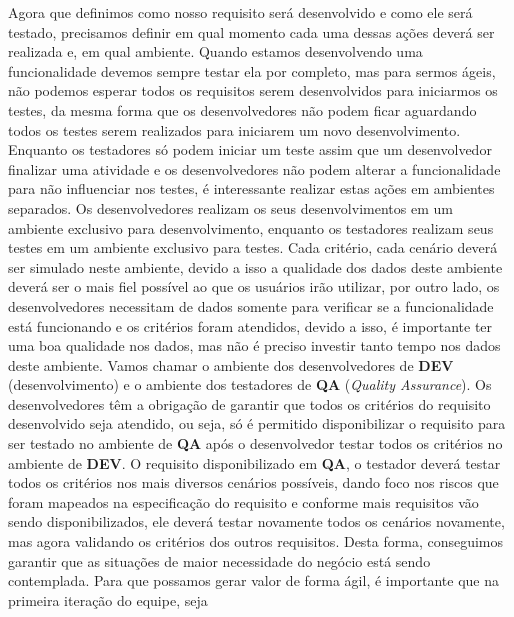       Agora que definimos como nosso requisito será desenvolvido e como ele será
      testado, precisamos definir em qual momento cada uma dessas ações deverá ser
      realizada e, em qual ambiente. Quando estamos desenvolvendo uma funcionalidade
      devemos sempre testar ela por completo, mas para sermos ágeis, não podemos
      esperar todos os requisitos serem desenvolvidos para iniciarmos os testes,
      da mesma forma que os desenvolvedores não podem ficar aguardando todos os
      testes serem realizados para iniciarem um novo desenvolvimento. Enquanto os
      testadores só podem iniciar um teste assim que um desenvolvedor finalizar
      uma atividade e os desenvolvedores não podem alterar a funcionalidade para não
      influenciar nos testes, é interessante realizar estas ações em ambientes
      separados. Os desenvolvedores realizam os seus desenvolvimentos em um ambiente
      exclusivo para desenvolvimento, enquanto os testadores realizam seus testes
      em um ambiente exclusivo para testes. Cada critério, cada cenário deverá ser
      simulado neste ambiente, devido a isso a qualidade dos dados deste ambiente
      deverá ser o mais fiel possível ao que os usuários irão utilizar, por outro
      lado, os desenvolvedores necessitam de dados somente para verificar se a
      funcionalidade está funcionando e os critérios foram atendidos, devido a isso,
      é importante ter uma boa qualidade nos dados, mas não é preciso investir
      tanto tempo nos dados deste ambiente. Vamos chamar o ambiente dos desenvolvedores
      de \textbf{DEV} (desenvolvimento) e o ambiente dos testadores de \textbf{QA}
      (\textit{Quality Assurance}). \newline
      Os desenvolvedores têm a obrigação de garantir que todos os critérios do
      requisito desenvolvido seja atendido, ou seja, só é permitido disponibilizar
      o requisito para ser testado no ambiente de \textbf{QA} após o desenvolvedor
      testar todos os critérios no ambiente de \textbf{DEV}. O requisito disponibilizado
      em \textbf{QA}, o testador deverá testar todos os critérios nos mais diversos
      cenários possíveis, dando foco nos riscos que foram mapeados na especificação
      do requisito e conforme mais requisitos vão sendo disponibilizados, ele deverá
      testar novamente todos os cenários novamente, mas agora validando os critérios
      dos outros requisitos. Desta forma, conseguimos garantir que as situações de
      maior necessidade do negócio está sendo contemplada. Para que possamos gerar
      valor de forma ágil, é importante que na primeira iteração do equipe, seja
